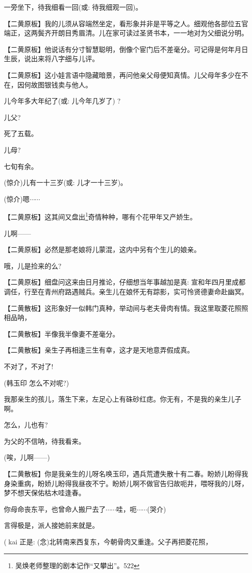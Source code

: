 {{一旁坐下，待我细看一回({\akai 或}: 待我}细观一回{)。}

\setlength{\hangindent}{60pt} {【{\akai 二黄原板}】我的儿须从容端然坐定，看形象并非是平等之人。细观他各部位五官端正，这两鬓齐开朗目秀眉清。儿在家可读过圣贤书本，一一地对为父细说分明。}

\setlength{\hangindent}{60pt} {【{\akai 二黄原板}】他说话有分寸智慧聪明，倒像个宦门后不差毫分。可记得是何年月日生辰，说出来将八字细与儿评。}

\setlength{\hangindent}{60pt} {【{\akai 二黄原板}】这小娃言语中隐藏暗景，再问他亲父母便知真情。儿父母年多少在不在，因何故图银钱卖与他人。}

{儿今年多大年纪了({\akai 或}: }儿今年几岁了{) ?}

{儿父?}

{死了五载。}

{儿母?}

{七旬有余。}

{(惊介)儿有一十三岁({\akai 或}: }儿才一十三岁{)。}

{(惊介)嗯$\cdots{}\cdots{}$}

\setlength{\hangindent}{60pt} {【{\akai 二黄原板}】这其间又盘出}\footnote{ 吴焕老师整理的剧本记作``又攀出''。{522}}{奇情种种，哪有个花甲年又产娇生。}

{儿啊------}

\setlength{\hangindent}{60pt} {【{\akai 二黄原板}】必然是那老娘将儿蒙混，这内中另有个生儿的娘亲。}

{哦，儿是捡来的么?}

\setlength{\hangindent}{60pt} {【{\akai 二黄原板}】细盘问这来由日月推论，仔细想当年事越加是真: 宣和年四月里成都调任，行至在青州府路遇贼兵。亲生儿在娘怀无有踪影，实可怜贤德妻命赴幽冥。}

\setlength{\hangindent}{60pt} {【{\akai 二黄散板}】这形象好一似韩门真种，举动间与老夫骨肉有情。我这里取菱花照照相品呐，}

\setlength{\hangindent}{60pt} {【{\akai 二黄散板}】半像我半像妻不差毫分。}

\setlength{\hangindent}{60pt} {【{\akai 二黄散板}】亲生子再相逢三生有幸，这才是天地意弄假成真。}

{不对了，不对了!}

{(韩玉印 怎么不对呢?)}

{我那亲生的孩儿，落生下来，左足心上有硃砂红痣。你无有，不是我的亲生儿子啊。}

{怎么，儿也有?}

{为父的不信呐，待我看来。}

{(唉，儿啊------)}

\setlength{\hangindent}{60pt} {【{\akai 二黄散板}】你是我亲生的儿呀名唤玉印，遇兵荒遭失散十有二春。盼娇儿盼得我身染重病，盼娇儿盼得我昼夜不宁。盼娇儿啊不做官告归故呃井，喂呀我的儿呀，梦不想天保佑枯木哇逢春。}

{你母命丧东平，也曾命人搬尸去了$\cdots{}\cdots{}$哇，呃$\cdots{}\cdots{}$(哭介)}

{言得极是，派人接她前来就是。}

{(kai 正是}: ({\akai 念})北转南来西复东，今朝骨肉又重逢。父子再把菱花照，}

